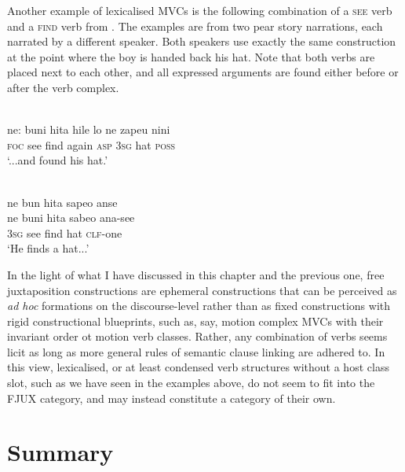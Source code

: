 Another example of lexicalised MVCs is the following combination of a \textsc{see} verb and a \textsc{find} verb from . The examples are from two pear story narrations, each narrated by a different speaker. Both speakers use exactly the same construction at the point where the boy is handed back his hat. Note that both verbs are placed next to each other, and all expressed arguments are found either before or after the verb complex.

\ea 
{}\\
\gll ne: buni hita hile lo ne zapeu nini \\
\textsc{foc} see find again \textsc{asp} 3\textsc{sg} hat \textsc{poss} \\
\glft `...and found his hat.'\\ 
\z

\ea 
{}\\
\glll ne bun hita sapeo anse \\
ne buni hita sabeo ana-see \\
3\textsc{sg} see find hat \textsc{clf}-one \\
\glft `He finds a hat...' \\ 
\z

In the light of what I have discussed in this chapter and the previous one, free juxtaposition constructions are ephemeral constructions that can be perceived as \textit{ad hoc} formations on the discourse-level rather than as fixed constructions with rigid constructional blueprints, such as, say, motion complex MVCs with their invariant order ot motion verb classes. Rather, any combination of verbs seems licit as long as more general rules of semantic clause linking are adhered to. In this view, lexicalised, or at least condensed verb structures without a host class slot, such as we have seen in the  examples above, do not seem to fit into the FJUX category, and may instead constitute a category of their own.

\section{Summary}

